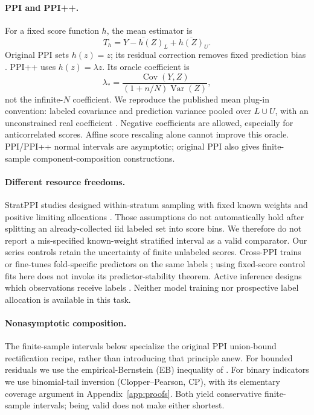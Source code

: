 \documentclass{article}
\newcommand{\Var}{\operatorname{Var}}
\newcommand{\Cov}{\operatorname{Cov}}
\begin{document}
\paragraph{PPI and PPI++.}
For a fixed score function $h$, the mean estimator is
\begin{equation}
 T_h=\overline{Y-h(Z)}_L+\overline{h(Z)}_U.
 \label{eq:est}
\end{equation}
Original PPI sets $h(z)=z$; its residual correction removes fixed prediction bias \citep{angelopoulos2023ppi}. PPI++ uses $h(z)=\lambda z$. Its oracle coefficient is
\begin{equation}
 \lambda_* = \frac{\Cov(Y,Z)}{(1+n/N)\Var(Z)},
 \label{eq:lambda}
\end{equation}
not the infinite-$N$ coefficient. We reproduce the published mean plug-in convention: labeled covariance and prediction variance pooled over $L\cup U$, with an unconstrained real coefficient \citep[Example 6.1]{angelopoulos2024ppiplus}. Negative coefficients are allowed, especially for anticorrelated scores. Affine score rescaling alone cannot improve this oracle. PPI/PPI++ normal intervals are asymptotic; original PPI also gives finite-sample component-composition constructions.

\paragraph{Different resource freedoms.}
StratPPI studies designed within-stratum sampling with fixed known weights and positive limiting allocations \citep{fisch2024strat}. Those assumptions do not automatically hold after splitting an already-collected iid labeled set into score bins. We therefore do not report a mis-specified known-weight stratified interval as a valid comparator. Our series controls retain the uncertainty of finite unlabeled scores. Cross-PPI trains or fine-tunes fold-specific predictors on the same labels \citep{zrnic2024cross}; using fixed-score control fits here does not invoke its predictor-stability theorem. Active inference designs which observations receive labels \citep{zrnic2024active}. Neither model training nor prospective label allocation is available in this task.

\paragraph{Nonasymptotic composition.}
The finite-sample intervals below specialize the original PPI union-bound rectification recipe, rather than introducing that principle anew. For bounded residuals we use the empirical-Bernstein (EB) inequality of \citet[Theorem 4]{maurer2009}. For binary indicators we use binomial-tail inversion (Clopper--Pearson, CP), with its elementary coverage argument in Appendix~\ref{app:proofs}. Both yield conservative finite-sample intervals; being valid does not make either shortest.
\end{document}

